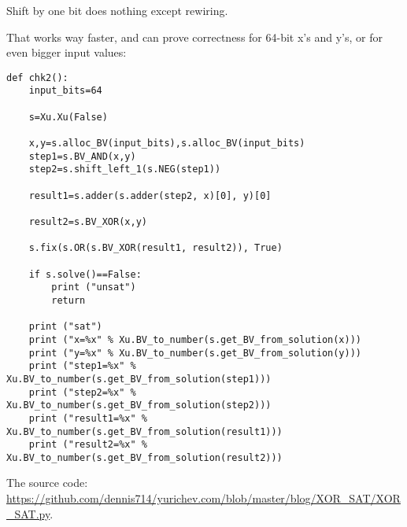 Shift by one bit does nothing except rewiring.

That works way faster, and can prove correctness for 64-bit x's and y's, or for even bigger input values:

\begin{lstlisting}
def chk2():
    input_bits=64

    s=Xu.Xu(False)

    x,y=s.alloc_BV(input_bits),s.alloc_BV(input_bits)
    step1=s.BV_AND(x,y)
    step2=s.shift_left_1(s.NEG(step1))

    result1=s.adder(s.adder(step2, x)[0], y)[0]

    result2=s.BV_XOR(x,y)

    s.fix(s.OR(s.BV_XOR(result1, result2)), True)

    if s.solve()==False:
        print ("unsat")
        return

    print ("sat")
    print ("x=%x" % Xu.BV_to_number(s.get_BV_from_solution(x)))
    print ("y=%x" % Xu.BV_to_number(s.get_BV_from_solution(y)))
    print ("step1=%x" % Xu.BV_to_number(s.get_BV_from_solution(step1)))
    print ("step2=%x" % Xu.BV_to_number(s.get_BV_from_solution(step2)))
    print ("result1=%x" % Xu.BV_to_number(s.get_BV_from_solution(result1)))
    print ("result2=%x" % Xu.BV_to_number(s.get_BV_from_solution(result2)))
\end{lstlisting}

The source code: \url{https://github.com/dennis714/yurichev.com/blob/master/blog/XOR_SAT/XOR_SAT.py}.


